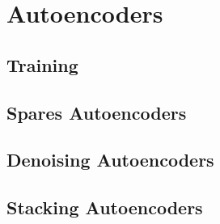 \chapter{Autoencoders}\label{chapter:da}

\section{Training}

\section{Spares Autoencoders}

\section{Denoising Autoencoders}

\section{Stacking Autoencoders}